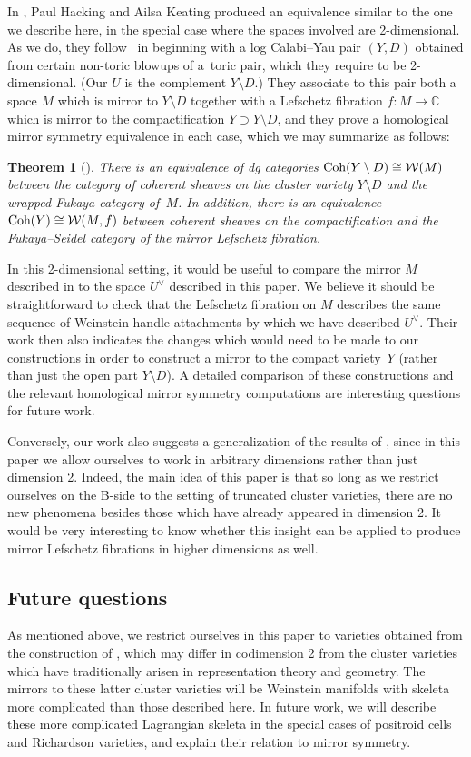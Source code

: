 \documentclass[10pt,a4paper]{amsart}
\numberwithin{equation}{section}
\def\CC{\mathbb{C}}
\def\cW{\mathcal{W}}
\newcommand{\Coh}{\textup{Coh}}
\newtheorem*{theorem*}{Theorem}
\begin{document}
In \cite{HK20}, Paul Hacking and Ailsa Keating produced an equivalence similar to the one we describe here, in the special case where the spaces involved are 2-dimensional. As we do, they follow~\cite{GHK2} in beginning with a log Calabi--Yau pair $(Y,D)$ obtained from certain non-toric blowups of a~toric pair, which they require to be 2-dimensional. (Our $U$ is the complement $Y \setminus D$.) They associate to this pair both a space $M$ which is mirror to $Y\setminus D$ together with a Lefschetz fibration $f\colon M\to \CC$ which is mirror to the compactification $Y\supset Y\setminus D$, and they prove a homological mirror symmetry equivalence in each case, which we may summarize as follows:
\begin{theorem*}[\cite{HK20}]
There is an equivalence of dg categories $\Coh(Y\setminus D)\cong \cW(M)$ between the category of coherent sheaves on the cluster variety $Y\setminus D$ and the wrapped Fukaya category of~$M$. In addition, there is an equivalence $\Coh(Y)\cong \cW(M,f)$ between coherent sheaves on the compactification and the Fukaya--Seidel category of the mirror Lefschetz fibration.
\end{theorem*}

In this 2-dimensional setting, it would be useful to compare the mirror $M$ described in \cite{HK20} to the space $U^\vee$ described in this paper. We believe it should be straightforward to check that the Lefschetz fibration on $M$ describes the same sequence of Weinstein handle attachments by which we have described $U^\vee$. Their work then also indicates the changes which would need to be made to our constructions in order to construct a mirror to the compact variety~$Y$ (rather than just the open part $Y\setminus D$). A detailed comparison of these constructions and the relevant homological mirror symmetry computations are interesting questions for future work.

Conversely, our work also suggests a generalization of the results of \cite{HK20}, since in this paper we allow ourselves to work in arbitrary dimensions rather than just dimension 2. Indeed, the main idea of this paper is that so long as we restrict ourselves on the B-side to the setting of truncated cluster varieties, there are no new phenomena besides those which have already appeared in dimension 2.
It would be very interesting to know whether this insight can be applied to produce mirror Lefschetz fibrations in higher dimensions as well.

\subsection{Future questions}\label{subsec:future}
As mentioned above, we restrict ourselves in this paper to varieties obtained from the construction of \cite{GHK2}, which may
differ in codimension 2 from the cluster varieties which have traditionally arisen in representation theory and geometry.
The mirrors to these latter cluster varieties will be Weinstein manifolds with skeleta more complicated than those described here.
In future work, we will describe these more complicated Lagrangian skeleta in the special cases of positroid cells and Richardson varieties, and explain their relation to mirror symmetry.
\end{document}
